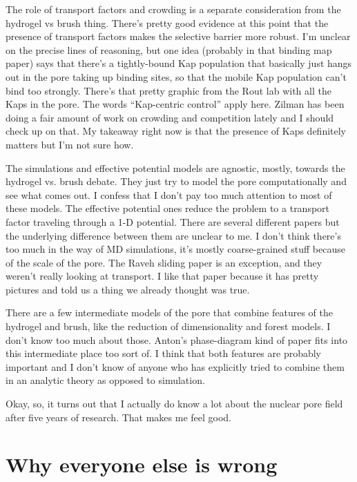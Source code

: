 {The role of transport factors and crowding is a separate consideration from the hydrogel vs brush thing.  There's pretty good evidence at this point that the presence of transport factors makes the selective barrier more robust.  I'm unclear on the precise lines of reasoning, but one idea (probably in that binding map paper) says that there's a tightly-bound Kap population that basically just hangs out in the pore taking up binding sites, so that the mobile Kap population can't bind too strongly.  There's that pretty graphic from the Rout lab with all the Kaps in the pore.  The words ``Kap-centric control'' apply here.  Zilman has been doing a fair amount of work on crowding and competition lately and I should check up on that.  My takeaway right now is that the presence of Kaps definitely matters but I'm not sure how.

The simulations and effective potential models are agnostic, mostly, towards the hydrogel vs. brush debate.  They just try to model the pore computationally and see what comes out.  I confess that I don't pay too much attention to most of these models.  The effective potential ones reduce the problem to a transport factor traveling through a 1-D potential.  There are several different papers but the underlying difference between them are unclear to me.  I don't think there's too much in the way of MD simulations, it's mostly coarse-grained stuff because of the scale of the pore.  The Raveh sliding paper is an exception, and they weren't really looking at transport.  I like that paper because it has pretty pictures and told us a thing we already thought was true.

There are a few intermediate models of the pore that combine features of the hydrogel and brush, like the reduction of dimensionality and forest models.  I don't know too much about those.  Anton's phase-diagram kind of paper fits into this intermediate place too sort of.  I think that both features are probably important and I don't know of anyone who has explicitly tried to combine them in an analytic theory as opposed to simulation.

Okay, so, it turns out that I actually do know a lot about the nuclear pore field after five years of research.  That makes me feel good.


\section{Why everyone else is wrong}

}
